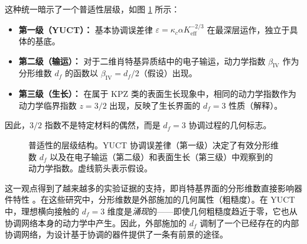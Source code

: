 \documentclass[12pt,a4paper]{article}
\begin{document}
	这种统一暗示了一个普适性层级，如图 \ref{fig:hierarchy} 所示：
	\begin{itemize}
		\item \textbf{第一级（YUCT）：} 基本协调误差律 $\varepsilon = \kappa_c \alpha K_{\mathrm{eff}}^{-2/3}$ 在最深层运作，独立于具体的基底。
		\item \textbf{第二级（输运）：} 对于二维肖特基异质结中的电子输运，动力学指数 $\beta_{\mathrm{IV}}$ 作为分形维数 $d_f$ 的函数以 $\beta_{\mathrm{IV}} = d_f/2$（假设）出现。
		\item \textbf{第三级（生长）：} 在属于 KPZ 类的表面生长现象中，相同的动力学指数作为动力学临界指数 $z = 3/2$ 出现，反映了生长界面的 $d_f = 3$ 性质（解释）。
	\end{itemize}
	因此，$3/2$ 指数不是特定材料的偶然，而是 $d_f = 3$ 协调过程的几何标志。
	
	\begin{figure}[htbp]
		\centering
		\caption{普适性的层级结构。YUCT 协调误差律（第一级）决定了有效分形维数 $d_f$ 以及在电子输运（第二级）和表面生长（第三级）中观察到的动力学指数。虚线箭头表示假设。}
		\label{fig:hierarchy}
	\end{figure}
	
	这一观点得到了越来越多的实验证据的支持，即肖特基界面的分形维数直接影响器件特性 \cite{FractalSchottky}。在这些研究中，分形维数是外部施加的几何属性（粗糙度）。在 YUCT 中，理想横向接触的 $d_f = 3$ 维度是\emph{涌现}的——即使几何粗糙度趋近于零，它也从协调网络本身的动力学中产生。因此，外部施加的 $d_f$ 调制了一个已经存在的内部协调网络，为设计基于协调的器件提供了一条有前景的途径。
	
\end{document}
